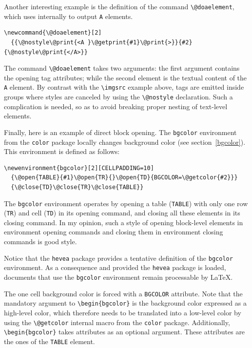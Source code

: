 Another interesting example is the definition of the command
\verb+\@doaelement+,
which \hevea{} uses internally to output \texttt{A} elements.
\begin{verbatim}
\newcommand{\@doaelement}[2]
  {{\@nostyle\@print{<A }\@getprint{#1}\@print{>}}{#2}{\@nostyle\@print{</A>}}
\end{verbatim}
The command \verb+\@doaelement+ takes two arguments: the first
argument contains the opening tag attributes; while the second element is
the textual content of the \verb+A+ element.
By contrast with the \verb+\imgsrc+ example above,
tags are emitted inside groups where styles are canceled by using the
\verb+\@nostyle+ declaration.
Such a complication is needed, so as to avoid breaking proper nesting
of text-level elements.

\label{getcolor:usage}
Finally, here is an example of direct block opening.
The \texttt{bgcolor} environment from the \texttt{color} package
locally changes background color (see section~\ref{bgcolor}).
This environment is defined as follows:
\begin{verbatim}
\newenvironment{bgcolor}[2][CELLPADDING=10]
  {\@open{TABLE}{#1}\@open{TR}{}\@open{TD}{BGCOLOR=\@getcolor{#2}}}
  {\@close{TD}\@close{TR}\@close{TABLE}}
\end{verbatim}
The \texttt{bgcolor} environment operates by opening a \html{} table
(\verb+TABLE+) with only one row (\verb+TR+) and cell (\verb+TD+) in
its opening command, and closing all these elements in its closing
command. In my opinion, such a style of opening block-level elements
in environment opening commands and closing them in environment
closing commands is good style.

Notice that the \texttt{hevea} package provides a tentative
definition of the \texttt{bgcolor} environment. As a consequence and
provided the \texttt{hevea} package is loaded, documents that use the
\texttt{bgcolor} environment remain processable by \LaTeX{}.


The one cell background color is forced with a \verb+BGCOLOR+
attribute.
Note that the mandatory argument to \verb+\begin{bgcolor}+ is the
background color expressed as a high-level color, which therefore
needs to be translated into a low-level color by using the
\verb+\@getcolor+ internal macro from the \texttt{color} package.
Additionally,  \verb+\begin{bgcolor}+ takes \html{} attributes
as an optional argument. These attributes are the ones of the
\verb+TABLE+ element.


